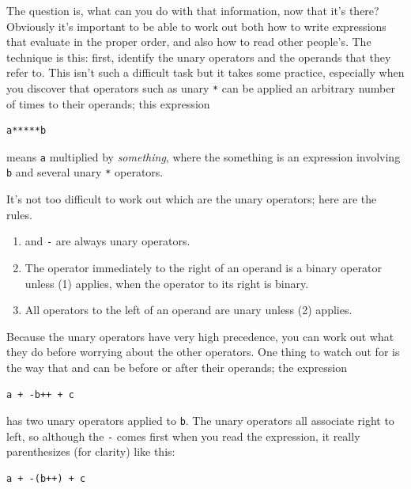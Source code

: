    The question is, what can you do with that information, now that it's
    there? Obviously it's important to be able to work out both how to write
    expressions that evaluate in the proper order, and also how to read other
    people's. The technique is this: first, identify the unary operators and
    the operands that they refer to. This isn't such a difficult task but it
    takes some practice, especially when you discover that operators such as
    unary \texttt{*} can be applied an arbitrary number of times to
    their operands; this expression


   \begin{Verbatim}
a*****b
\end{Verbatim}

   means \texttt{a} multiplied by \textit{something}, where the
    something is an expression involving \texttt{b} and several
    unary \texttt{*} operators.


   It's not too difficult to work out which are the unary operators; here
    are the rules.


   \begin{enumerate}
    \item \pp{} and \texttt{-} are always unary
     operators.
    \item The operator immediately to the right of an operand is a binary
     operator unless (1) applies, when the operator to its right is
     binary.
    \item All operators to the left of an operand are unary unless
     (2) applies.
   \end{enumerate}

   Because the unary operators have very high precedence, you can work out
    what they do before worrying about the other operators. One thing to watch
    out for is the way that \pp{} and \mm{} can
    be before or after their operands; the expression


   \begin{Verbatim}
a + -b++ + c
\end{Verbatim}

   has two unary operators applied to \texttt{b}. The unary
    operators all associate right to left, so although the \texttt{-}
    comes first when you read the expression, it really parenthesizes (for
    clarity) like this:


   \begin{Verbatim}
a + -(b++) + c
\end{Verbatim}

